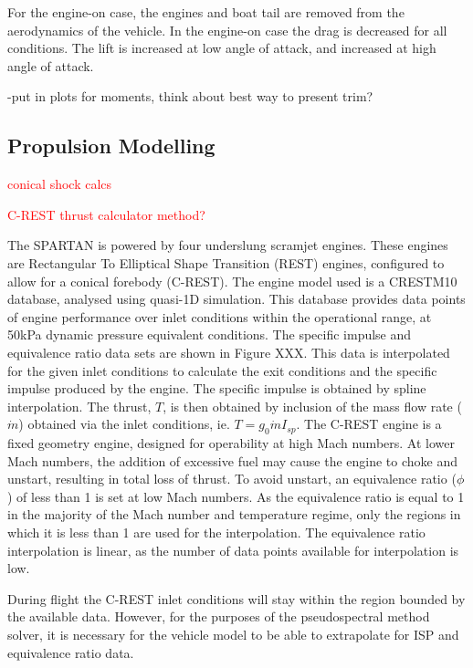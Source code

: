 For the engine-on case, the engines and boat tail are removed from the aerodynamics of the vehicle. In the engine-on case the drag is decreased for all conditions. The lift is increased at low angle of attack, and increased at high angle of attack.


-put in plots for moments, think about best way to present trim?


		
		\subsection{Propulsion Modelling}
		
		\textcolor{red}{conical shock calcs}
		
		\textcolor{red}{C-REST thrust calculator method?}
		
		The SPARTAN is powered by four underslung scramjet engines. These engines are Rectangular To Elliptical Shape Transition (REST) engines, configured to allow for a conical forebody (C-REST). The engine model used is a CRESTM10 database\cite{Preller2017}, analysed using quasi-1D simulation.
	This database provides data points of engine performance over inlet conditions within the operational range, at 50kPa dynamic pressure equivalent conditions. The specific impulse and equivalence ratio data sets are shown in Figure XXX. This data is interpolated for the given inlet conditions to calculate the exit conditions and the specific impulse produced by the engine. The specific impulse is obtained by spline interpolation. The thrust, $T$, is then obtained by inclusion of the mass flow rate ($\dot{m}$) obtained via the inlet conditions, ie. $T = g_0\dot{m}I_{sp}$.
	The C-REST engine is a fixed geometry engine, designed for operability at high Mach numbers\cite{Preller2017}. At lower Mach numbers, the addition of excessive fuel may cause the engine to choke and unstart, resulting in total loss of thrust\cite{Preller2017}. To avoid unstart, an equivalence ratio ($\phi$) of less than 1 is set at low Mach numbers. As the equivalence ratio is equal to 1 in the majority of the Mach number and temperature regime, only the regions in which it is less than 1 are used for the interpolation. The equivalence ratio interpolation is linear, as the number of data points available for interpolation is low. 
	
	During flight the C-REST inlet conditions will stay within the region bounded by the available data. However, for the purposes of the pseudospectral method solver, it is necessary for the vehicle model to be able to extrapolate for ISP and equivalence ratio data. 
	
